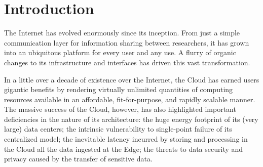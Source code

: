 \section{Introduction}
\label{sec:introduction}

The Internet has evolved enormously since its inception. From just a simple communication layer for information sharing between researchers, it has grown into an ubiquitous platform for every user and any use. 
A flurry of organic changes to its infrastructure and interfaces has driven this vast transformation.

In a little over a decade of existence over the Internet, the Cloud \cite{mell2011nist} has earned  users gigantic benefits by rendering virtually unlimited quantities of computing resources available in an affordable, fit-for-purpose, and rapidly scalable manner.
The massive success of the Cloud, however, has also highlighted important deficiencies in the nature of its architecture: the huge energy footprint of its (very large) data centers; the intrinsic vulnerability to single-point failure of its centralized model; the inevitable latency incurred by storing and processing in the Cloud all the data ingested at the Edge; the threats to data security and privacy caused by the transfer of sensitive data.

